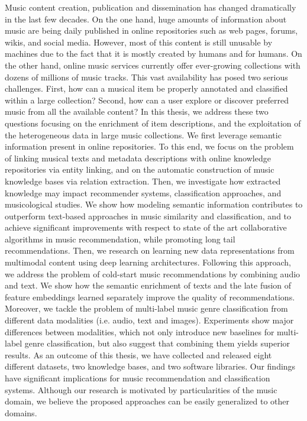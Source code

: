 Music content creation, publication and dissemination has changed dramatically in the last few decades. On the one hand, huge amounts of information about music are being daily published in online repositories such as web pages, forums, wikis, and social media. However, most of this content is still unusable by machines due to the fact that it is mostly created by humans and for humans. On the other hand, online music services currently offer ever-growing collections with dozens of millions of music tracks. This vast availability has posed two serious challenges. First, how can a musical item be properly annotated and classified within a large collection? Second, how can a user explore or discover preferred music from all the available content? In this thesis, we address these two questions focusing on the enrichment of item descriptions, and the exploitation of the heterogeneous data in large music collections. We first leverage semantic information present in online repositories. To this end, we focus on the problem of linking musical texts and metadata descriptions with online knowledge repositories via entity linking, and on the automatic construction of music knowledge bases via relation extraction. Then, we investigate how extracted knowledge may impact recommender systems, classification approaches, and musicological studies. We show how modeling semantic information contributes to outperform text-based approaches in music similarity and classification, and to achieve significant improvements with respect to state of the art collaborative algorithms in music recommendation, while promoting long tail recommendations. Then, we research on learning new data representations from multimodal content using deep learning architectures. Following this approach, we address the problem of cold-start music recommendations by combining audio and text. We show how the semantic enrichment of texts and the late fusion of feature embeddings learned separately improve the quality of recommendations. Moreover, we tackle the problem of multi-label music genre classification from different data modalities (i.e. audio, text and images). Experiments show major differences between modalities, which not only introduce new baselines for multi-label genre classification, but also suggest that combining them yields superior results. As an outcome of this thesis, we have collected and released eight different datasets, two knowledge bases, and two software libraries. Our findings have significant implications for music recommendation and classification systems. Although our research is motivated by particularities of the music domain, we believe the proposed approaches can be easily generalized to other domains.
